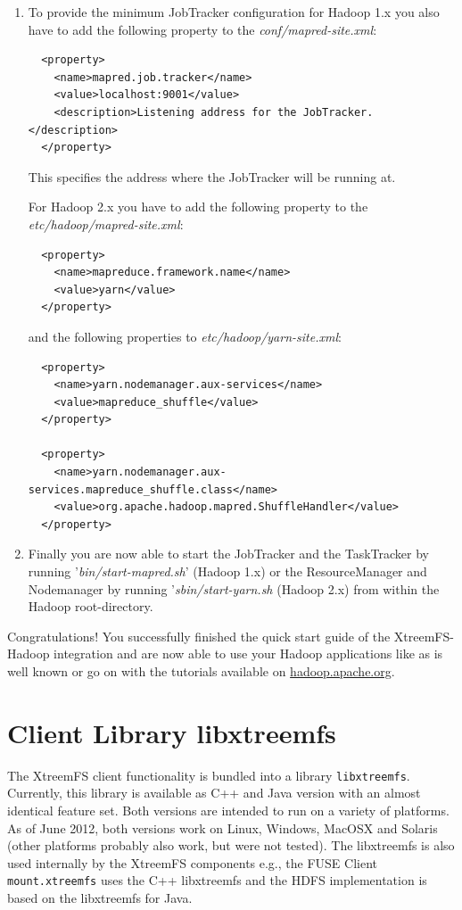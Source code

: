 \documentclass[a4paper,10pt]{book}
\begin{document}
\begin{enumerate}
\item To provide the minimum JobTracker configuration for Hadoop 1.x you also have to add the following property to the 
	\textit{conf/mapred-site.xml}:
	
	\begin{verbatim}
  <property>
    <name>mapred.job.tracker</name>
    <value>localhost:9001</value>
    <description>Listening address for the JobTracker.</description>
  </property>
	\end{verbatim}
	This specifies the address where the JobTracker will be running at.

For Hadoop 2.x you have to add the following property to the \textit{etc/hadoop/mapred-site.xml}:

	\begin{verbatim}
  <property>
    <name>mapreduce.framework.name</name>
    <value>yarn</value>
  </property>	
	\end{verbatim}
	
    and the following properties to \textit{etc/hadoop/yarn-site.xml}:

   \begin{verbatim}
  <property>
    <name>yarn.nodemanager.aux-services</name>
    <value>mapreduce_shuffle</value>
  </property>

  <property>
    <name>yarn.nodemanager.aux-services.mapreduce_shuffle.class</name>
    <value>org.apache.hadoop.mapred.ShuffleHandler</value>
  </property>
   \end{verbatim}
\item Finally you are now able to start the JobTracker and the TaskTracker by running '\textit{bin/start-mapred.sh}' (Hadoop 1.x) or the ResourceManager and Nodemanager by running '\textit{sbin/start-yarn.sh} (Hadoop 2.x) from within the Hadoop root-directory.

\end{enumerate}
Congratulations! You successfully finished the quick start guide of the XtreemFS-Hadoop integration and are now able to use your Hadoop applications like as is well known or go on with the tutorials available on \href{http://hadoop.apache.org}{hadoop.apache.org}.

\chapter{Client Library libxtreemfs}
\label{sec:libxtreemfs}

The XtreemFS client functionality is bundled into a library \texttt{libxtreemfs}. Currently, this library is available as C++ and Java version with an almost identical feature set. Both versions are intended to run on a variety of platforms. As of June 2012, both versions work on Linux, Windows, MacOSX and Solaris (other platforms probably also work, but were not tested). The libxtreemfs is also used internally by the XtreemFS components e.g., the FUSE Client \texttt{mount.xtreemfs} uses the C++ libxtreemfs and the HDFS implementation is based on the libxtreemfs for Java.
\end{document}
